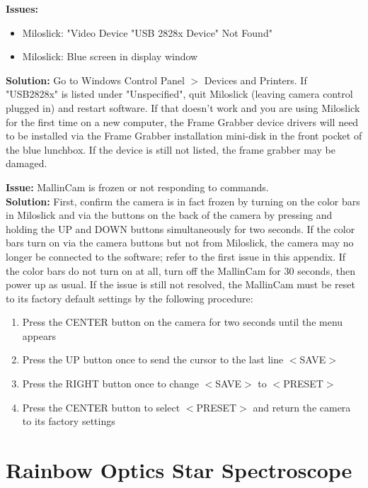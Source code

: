 \documentclass[12pt,titlepage]{article}
\begin{document}
\textbf{\flushleft Issues:}
\begin{itemize}
	\item Miloslick: "Video Device "USB 2828x Device" Not Found"
	\item Miloslick: Blue screen in display window
\end{itemize}
\textbf{Solution:} Go to Windows Control Panel $>$ Devices and Printers.
If "USB2828x" is listed under "Unspecified", quit Miloslick (leaving camera control plugged in) and restart software.
If that doesn't work and you are using Miloslick for the first time on a new computer, the Frame Grabber device drivers will need to be installed via the Frame Grabber installation mini-disk in the front pocket of the blue lunchbox. If the device is still not listed, the frame grabber may be damaged.

\textbf{\flushleft Issue:} MallinCam is frozen or not responding to commands.\\
\textbf{Solution:} First, confirm the camera is in fact frozen by turning on the color bars in Miloslick and via the buttons on the back of the camera by pressing and holding the UP and DOWN buttons simultaneously for two seconds. If the color bars turn on via the camera buttons but not from Miloslick, the camera may no longer be connected to the software; refer to the first issue in this appendix. If the color bars do not turn on at all, turn off the MallinCam for 30 seconds, then power up as usual. If the issue is still not resolved, the MallinCam must be reset to its factory default settings by the following procedure:
\begin{enumerate}
	\item Press the CENTER button on the camera for two seconds until the menu appears
	\item Press the UP button once to send the cursor to the last line $<$SAVE$>$
	\item Press the RIGHT button once to change $<$SAVE$>$ to $<$PRESET$>$
	\item Press the CENTER button to select $<$PRESET$>$ and return the camera to its factory settings
\end{enumerate}




\section{Rainbow Optics Star Spectroscope}
\end{document}

